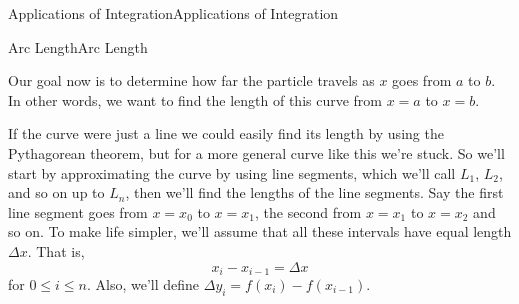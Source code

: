 \documentclass[10pt,]{book}
\numberwithin{equation}{section}
\begin{document}
\begin{chapterptx}{Applications of Integration}{}{Applications of Integration}{}{}
\begin{sectionptx}{Arc Length}{}{Arc Length}{}{}
\begin{figure}
{
}
\end{figure}
%
\par
\hypertarget{p-650}{}%
Our goal now is to determine how far the particle travels as \(x\) goes from \(a\) to \(b\). In other words, we want to find the length of this curve from \(x=a\) to \(x=b\).%
\par
\hypertarget{p-651}{}%
If the curve were just a line we could easily find its length by using the Pythagorean theorem, but for a more general curve like this we're stuck. So we'll start by approximating the curve by using line segments, which we'll call \(L_1\), \(L_2\), and so on up to \(L_{n}\), then we'll find the lengths of the line segments. Say the first line segment goes from \(x=x_0\) to \(x=x_1\), the second from \(x=x_1\) to \(x=x_2\) and so on. To make life simpler, we'll assume that all these intervals have equal length \(\Delta x\). That is,%
\begin{equation*}
x_{i} - x_{i-1}  = \Delta x
\end{equation*}
for \(0 \leq i\leq n\). Also, we'll define \(\Delta y_{i} = f(x_{i}) - f(x_{i-1})\).%
\begin{figure}
\centering
{
}
\end{figure}
\end{sectionptx}
\end{chapterptx}
\end{document}
